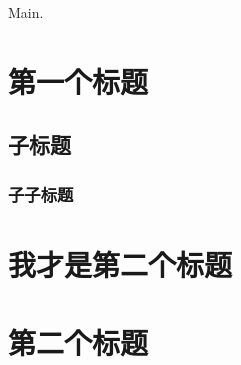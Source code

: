 \documentclass{article}
\begin{document}
Main.

\section{第一个标题}

\subsection{子标题}

\subsubsection{子子标题}

\section{我才是第二个标题}

\section{第二个标题}
\end{document}
